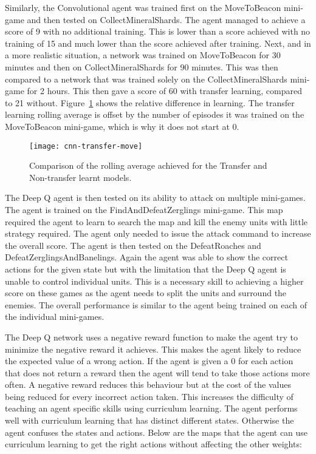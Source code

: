 Similarly, the Convolutional agent was trained first on the MoveToBeacon
mini-game and then tested on CollectMineralShards. The agent managed to achieve
a score of 9 with no additional training. This is lower than a score achieved
with no training of 15 and much lower than the score achieved after training.
Next, and in a more realistic situation, a network was trained on MoveToBeacon
for 30 minutes and then on CollectMineralShards for 90 minutes. This was then
compared to a network that was trained solely on the CollectMineralShards
mini-game for 2 hours. This then gave a score of 60 with transfer learning,
compared to 21 without. Figure~\ref{fig:transfer_cnn_move} shows the relative
difference in learning. The transfer learning rolling average is offset by the
number of episodes it was trained on the MoveToBeacon mini-game, which is why it
does not start at 0.

\begin{figure}[h]
    \centering
    \texttt{[image: cnn-transfer-move]}
    \caption{Comparison of the rolling average achieved for the Transfer and
    Non-transfer learnt models.}%
    \label{fig:transfer_cnn_move}%
\end{figure}

The Deep Q agent is then tested on its ability to attack on multiple mini-games.
The agent is trained on the FindAndDefeatZerglings mini-game. This map required
the agent to learn to search the map and kill the enemy units with little
strategy required. The agent only needed to issue the attack command to increase
the overall score. The agent is then tested on the DefeatRoaches and
DefeatZerglingsAndBanelings. Again the agent was able to show the correct
actions for the given state but with the limitation that the Deep Q agent is
unable to control individual units. This is a necessary skill to achieving a
higher score on these games as the agent needs to split the units and surround
the enemies. The overall performance is similar to the agent being trained on
each of the individual mini-games.

The Deep Q network uses a negative reward function to make the agent try to
minimize the negative reward it achieves. This makes the agent likely to reduce
the expected value of a wrong action. If the agent is given a 0 for each action
that does not return a reward then the agent will tend to take those actions
more often. A negative reward reduces this behaviour but at the cost of the
values being reduced for every incorrect action taken. This increases the
difficulty of teaching an agent specific skills using curriculum learning. The
agent performs well with curriculum learning that has distinct different states.
Otherwise the agent confuses the states and actions. Below are the maps that the
agent can use curriculum learning to get the right actions without affecting the
other weights:

